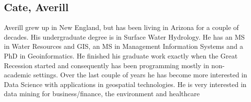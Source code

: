 
\subsection{Cate, Averill}
Averill grew up in New England, but has been living in Arizona for a couple of decades.  His undergraduate degree is in
Surface Water Hydrology.  He has an MS in Water Resources and GIS, an MS in Management Information Systems and a  PhD in
Geoinformatics.  He finished his graduate work exactly when the Great Recession started and consequently has been programming
mostly in non-academic settings.  Over the last couple of years he has become more interested in Data Science with
applications in geospatial technologies.   He is very interested in data mining for business/finance, the environment and
healthcare

